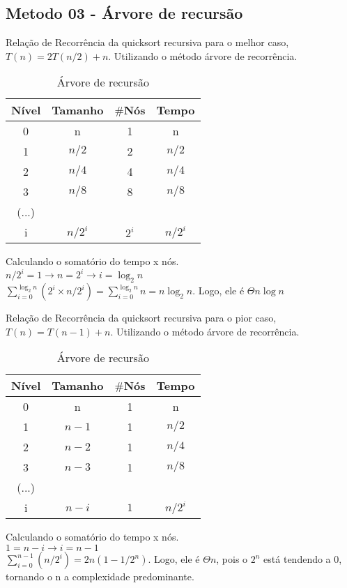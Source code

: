 \subsection{Metodo 03 - Árvore de recursão}
Relação de Recorrência da quicksort recursiva para o melhor caso, $T(n) = 2T(n/2) + n$. Utilizando o método árvore de recorrência.

\begin{table}[ht!]
    \centering
    \begin{tabular}{|c|c|c|c|}
    \hline
    \textbf{Nível} & \textbf{Tamanho} & $\#$\textbf{Nós} & \textbf{Tempo} \\ \hline
     0 & n & 1 & n \\ \hline
     1 & $n/2$ & 2 & $n/2$ \\ \hline
     2 & $n/4$ & 4 & $n/4$ \\ \hline
     3 & $n/8$ & 8 & $n/8$ \\ \hline
     (...) & & & \\ \hline
     i & $n/2^i$ & $2^i$ & $n/2^i$ \\ \hline 
    \end{tabular}  
    \caption{Árvore de recursão}
\end{table}

Calculando o somatório do tempo x nós. \\
$n/2^i = 1 \rightarrow n = 2^i \rightarrow i = \log_2{n}$ \\
$\sum_{i=0}^{\log_2{n}} (2^i \times n/2^i) = \sum_{i=0}^{\log_2{n}} n = n \log_2{n}$. Logo, ele é $\Theta n \log{n}$ 

Relação de Recorrência da quicksort recursiva para o pior caso, $T(n) = T(n - 1) + n$. Utilizando o método árvore de recorrência.

\begin{table}[ht!]
    \centering
    \begin{tabular}{|c|c|c|c|}
    \hline
    \textbf{Nível} & \textbf{Tamanho} & $\#$\textbf{Nós} & \textbf{Tempo} \\ \hline
     0 & n & 1 & n \\ \hline
     1 & $n - 1$ & 1 & $n/2$ \\ \hline
     2 & $n - 2$ & 1 & $n/4$ \\ \hline
     3 & $n - 3$ & 1 & $n/8$ \\ \hline
     (...) & & & \\ \hline
     i & $n - i$ & $1$ & $n/2^i$ \\ \hline 
    \end{tabular}  
    \caption{Árvore de recursão}
\end{table}

Calculando o somatório do tempo x nós. \\
$1 = n -i \rightarrow i = n - 1$ \\
$\sum_{i = 0}^{n - 1} (n/2^i) = 2n(1 - 1/2^n)$. Logo, ele é $\Theta n$, pois o $2^n$ está tendendo a 0, tornando o n a complexidade predominante.